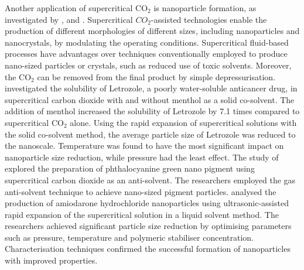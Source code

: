 \documentclass[a4paper,fleqn]{cas-dc}
\begin{document}
Another application of supercritical CO$_2$ is nanoparticle formation, as investigated by \citet{Padrela2018}, \citet{Franco2021} and \citet{Sodeifian2022}. Supercritical $CO_2$-assisted technologies enable the production of different morphologies of different sizes, including nanoparticles and nanocrystals, by modulating the operating conditions. Supercritical fluid-based processes have advantages over techniques conventionally employed to produce nano-sized particles or crystals, such as reduced use of toxic solvents. Moreover, the CO$_2$ can be removed from the final product by simple depressurisation. 
\citet{Sodeifian2018} investigated the solubility of Letrozole, a poorly water-soluble anticancer drug, in supercritical carbon dioxide with and without menthol as a solid co-solvent. The addition of menthol increased the solubility of Letrozole by 7.1 times compared to supercritical CO$_2$ alone. Using the rapid expansion of supercritical solutions with the solid co-solvent method, the average particle size of Letrozole was reduced to the nanoscale. Temperature was found to have the most significant impact on nanoparticle size reduction, while pressure had the least effect. 
The study of \citet{SaadatiArdestani2020} explored the preparation of phthalocyanine green nano pigment using supercritical carbon dioxide as an anti-solvent. The researchers employed the gas anti-solvent technique to achieve nano-sized pigment particles.
\citet{Sodeifian2019} analysed the production of amiodarone hydrochloride nanoparticles using ultrasonic-assisted rapid expansion of the supercritical solution in a liquid solvent method. The researchers achieved significant particle size reduction by optimising parameters such as pressure, temperature and polymeric stabiliser concentration. Characterisation techniques confirmed the successful formation of nanoparticles with improved properties.
\end{document}
